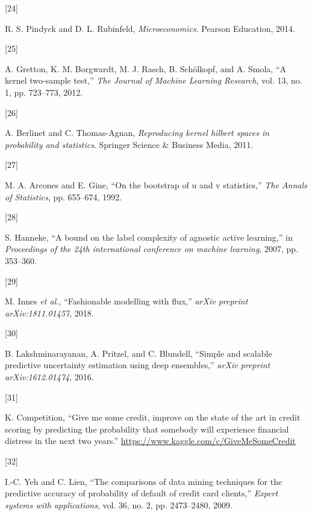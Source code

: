 \documentclass[conference,final,]{IEEEtran}
\newlength{\cslhangindent}
\newlength{\csllabelwidth}
\newlength{\cslentryspacingunit} %
\newenvironment{CSLReferences}[2] %
 {%
  \setlength{\parindent}{0pt}
  \ifodd #1
  \let\oldpar\par
  \def\par{\hangindent=\cslhangindent\oldpar}
  \fi
  \setlength{\parskip}{#2\cslentryspacingunit}
 }%
 {}
\newcommand{\CSLLeftMargin}[1]{\parbox[t]{\csllabelwidth}{#1}}
\newcommand{\CSLRightInline}[1]{\parbox[t]{\linewidth - \csllabelwidth}{#1}\break}
\begin{document}
\begin{CSLReferences}{0}{0}
\leavevmode{}%
\CSLLeftMargin{{[}24{]} }%
\CSLRightInline{R. S. Pindyck and D. L. Rubinfeld, \emph{Microeconomics}. Pearson Education, 2014.}

\leavevmode{}%
\CSLLeftMargin{{[}25{]} }%
\CSLRightInline{A. Gretton, K. M. Borgwardt, M. J. Rasch, B. Schölkopf, and A. Smola, {``A kernel two-sample test,''} \emph{The Journal of Machine Learning Research}, vol. 13, no. 1, pp. 723--773, 2012.}

\leavevmode{}%
\CSLLeftMargin{{[}26{]} }%
\CSLRightInline{A. Berlinet and C. Thomas-Agnan, \emph{Reproducing kernel hilbert spaces in probability and statistics}. Springer Science \& Business Media, 2011.}

\leavevmode{}%
\CSLLeftMargin{{[}27{]} }%
\CSLRightInline{M. A. Arcones and E. Gine, {``On the bootstrap of u and v statistics,''} \emph{The Annals of Statistics}, pp. 655--674, 1992.}

\leavevmode{}%
\CSLLeftMargin{{[}28{]} }%
\CSLRightInline{S. Hanneke, {``A bound on the label complexity of agnostic active learning,''} in \emph{Proceedings of the 24th international conference on machine learning}, 2007, pp. 353--360.}

\leavevmode{}%
\CSLLeftMargin{{[}29{]} }%
\CSLRightInline{M. Innes \emph{et al.}, {``Fashionable modelling with flux,''} \emph{arXiv preprint arXiv:1811.01457}, 2018.}

\leavevmode{}%
\CSLLeftMargin{{[}30{]} }%
\CSLRightInline{B. Lakshminarayanan, A. Pritzel, and C. Blundell, {``Simple and scalable predictive uncertainty estimation using deep ensembles,''} \emph{arXiv preprint arXiv:1612.01474}, 2016.}

\leavevmode{}%
\CSLLeftMargin{{[}31{]} }%
\CSLRightInline{K. Competition, {``Give me some credit, improve on the state of the art in credit scoring by predicting the probability that somebody will experience financial distress in the next two years.''} \url{https://www.kaggle.com/c/GiveMeSomeCredit}}

\leavevmode{}%
\CSLLeftMargin{{[}32{]} }%
\CSLRightInline{I.-C. Yeh and C. Lien, {``The comparisons of data mining techniques for the predictive accuracy of probability of default of credit card clients,''} \emph{Expert systems with applications}, vol. 36, no. 2, pp. 2473--2480, 2009.}


\end{CSLReferences}
\end{document}
